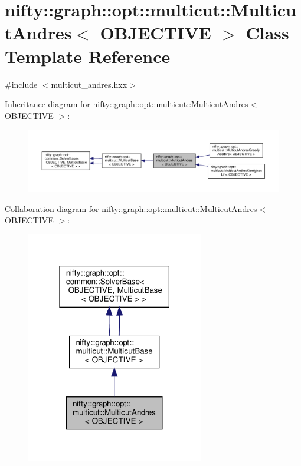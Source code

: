 \hypertarget{classnifty_1_1graph_1_1opt_1_1multicut_1_1MulticutAndres}{}\section{nifty\+:\+:graph\+:\+:opt\+:\+:multicut\+:\+:Multicut\+Andres$<$ O\+B\+J\+E\+C\+T\+I\+VE $>$ Class Template Reference}
\label{classnifty_1_1graph_1_1opt_1_1multicut_1_1MulticutAndres}


{\ttfamily \#include $<$multicut\+\_\+andres.\+hxx$>$}



Inheritance diagram for nifty\+:\+:graph\+:\+:opt\+:\+:multicut\+:\+:Multicut\+Andres$<$ O\+B\+J\+E\+C\+T\+I\+VE $>$\+:
\nopagebreak
\begin{figure}[H]
\begin{center}
\leavevmode
\includegraphics[width=350pt]{classnifty_1_1graph_1_1opt_1_1multicut_1_1MulticutAndres__inherit__graph}
\end{center}
\end{figure}


Collaboration diagram for nifty\+:\+:graph\+:\+:opt\+:\+:multicut\+:\+:Multicut\+Andres$<$ O\+B\+J\+E\+C\+T\+I\+VE $>$\+:
\nopagebreak
\begin{figure}[H]
\begin{center}
\leavevmode
\includegraphics[width=219pt]{classnifty_1_1graph_1_1opt_1_1multicut_1_1MulticutAndres__coll__graph}
\end{center}
\end{figure}
